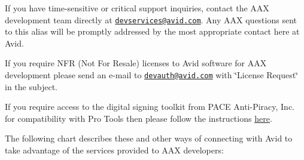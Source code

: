 If you have time-\/sensitive or critical support inquiries, contact the A\+A\+X development team directly at \href{mailto:devservices@avid.com}{\tt devservices@avid.\+com}. Any A\+A\+X questions sent to this alias will be promptly addressed by the most appropriate contact here at Avid.

If you require N\+F\+R (Not For Resale) licenses to Avid software for A\+A\+X development please send an e-\/mail to \href{mailto:devauth@avid.com}{\tt devauth@avid.\+com} with \char`\"{}\+License Request\char`\"{} in the subject.

If you require access to the digital signing toolkit from P\+A\+C\+E Anti-\/\+Piracy, Inc. for compatibility with Pro Tools then please follow the instructions \hyperlink{a00360_subsection__digital_signature_}{here}.

The following chart describes these and other ways of connecting with Avid to take advantage of the services provided to A\+A\+X developers\+:

  